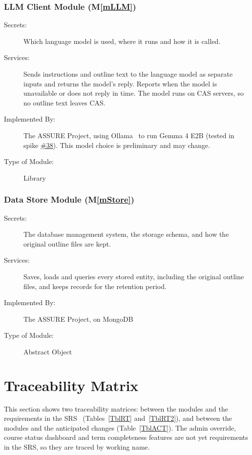 \documentclass[12pt, titlepage]{article}
\newcommand{\sysname}{The ASSURE Project}
\newcommand{\mref}[1]{M\ref{#1}}
\begin{document}
\subsubsection{LLM Client Module (\mref{mLLM})}

\begin{description}
\item[Secrets:] Which language model is used, where it runs and how it is
  called.
\item[Services:] Sends instructions and outline text to the language model as
  separate inputs and returns the model's reply. Reports when the model is
  unavailable or does not reply in time. The model runs on CAS servers, so no
  outline text leaves CAS.
\item[Implemented By:] \sysname, using Ollama~\citep{Ollama} to run Gemma 4 E2B (tested in spike
  \href{https://github.com/shivyam/cas-course-optimization/issues/38}{\#38}). This
  model choice is preliminary and may change.
\item[Type of Module:] Library
\end{description}

\subsubsection{Data Store Module (\mref{mStore})} \label{SecMD-mStore}

\begin{description}
\item[Secrets:] The database management system, the storage schema, and how
  the original outline files are kept.
\item[Services:] Saves, loads and queries every stored entity, including the
  original outline files, and keeps records for the retention period.
\item[Implemented By:] \sysname, on MongoDB~\citep{MongoDB}
\item[Type of Module:] Abstract Object
\end{description}


\section{Traceability Matrix} \label{SecTM}

This section shows two traceability matrices: between the modules and the
requirements in the SRS~\citep{TeamBVSH2026SRS} (Tables~\ref{TblRT}
and~\ref{TblRT2}), and between the modules and the anticipated changes
(Table~\ref{TblACT}). The admin override, course status dashboard and term
completeness features are not yet requirements in the SRS, so they are traced
by working name.
\end{document}
